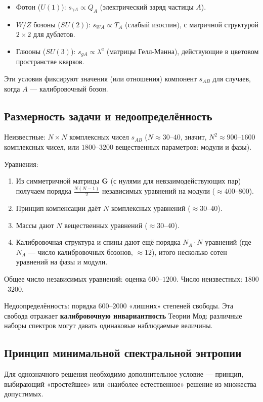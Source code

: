 \documentclass[12pt,a4paper]{article}
\begin{document}
\begin{itemize}
    \item Фотон ($U(1)$): $s_{\gamma A} \propto Q_A$ (электрический заряд частицы $A$).
    \item $W/Z$ бозоны ($SU(2)$): $s_{WA} \propto T_A$ (слабый изоспин), с матричной структурой $2 \times 2$ для дублетов.
    \item Глюоны ($SU(3)$): $s_{gA} \propto \lambda^a$ (матрицы Гелл-Манна), действующие в цветовом пространстве кварков.
\end{itemize}

Эти условия фиксируют значения (или отношения) компонент $s_{AB}$ для случаев, когда $A$ --- калибровочный бозон.

\subsection{Размерность задачи и недоопределённость}

Неизвестные: $N \times N$ комплексных чисел $s_{AB}$ ($N \approx 30$--$40$, значит, $N^2 \approx 900$--$1600$ комплексных чисел, или $1800$--$3200$ вещественных параметров: модули и фазы).

Уравнения:

\begin{enumerate}[label=(\arabic*)]
    \item Из симметричной матрицы $\mathbf{G}$ (с нулями для невзаимодействующих пар) получаем порядка $\frac{N(N-1)}{2}$ независимых уравнений на модули ($\approx 400$--$800$).
    \item Принцип компенсации даёт $N$ комплексных уравнений ($\approx 30$--$40$).
    \item Массы дают $N$ вещественных уравнений ($\approx 30$--$40$).
    \item Калибровочная структура и спины дают ещё порядка $N_A \cdot N$ уравнений (где $N_A$ --- число калибровочных бозонов, $\approx 12$), итого несколько сотен уравнений на фазы и модули.
\end{enumerate}

Общее число независимых уравнений: оценка $600$--$1200$. Число неизвестных: $1800$--$3200$.

Недоопределённость: порядка $600$--$2000$ «лишних» степеней свободы. Эта свобода отражает \textbf{калибровочную инвариантность} Теории Мод: различные наборы спектров могут давать одинаковые наблюдаемые величины.

\subsection{Принцип минимальной спектральной энтропии}
Для однозначного решения необходимо дополнительное условие --- принцип, выбирающий «простейшее» или «наиболее естественное» решение из множества допустимых.
\end{document}
